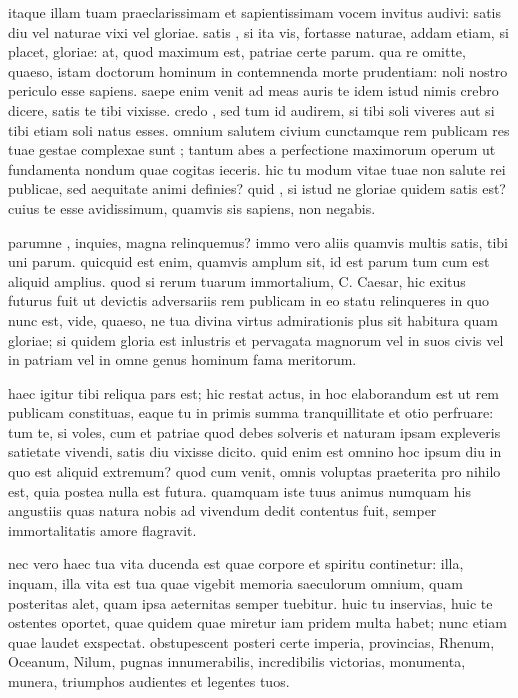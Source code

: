  itaque illam tuam praeclarissimam et sapientissimam vocem invitus audivi: satis diu vel naturae vixi vel gloriae. satis , si ita vis, fortasse naturae, addam etiam, si placet, gloriae: at, quod maximum est, patriae certe parum. qua re omitte, quaeso, istam doctorum hominum in contemnenda morte prudentiam: noli nostro periculo esse sapiens. saepe enim venit ad meas auris te idem istud nimis crebro dicere, satis te tibi vixisse. credo , sed tum id audirem, si tibi soli viveres aut si tibi etiam soli natus esses. omnium salutem civium cunctamque rem publicam res tuae gestae complexae sunt ; tantum abes a perfectione maximorum operum ut fundamenta nondum quae cogitas ieceris. hic tu modum vitae tuae non salute rei publicae, sed aequitate animi definies? quid , si istud ne gloriae quidem satis est? cuius te esse avidissimum, quamvis sis sapiens, non negabis.

 parumne , inquies, magna relinquemus? immo vero aliis quamvis multis satis, tibi uni parum. quicquid est enim, quamvis amplum sit, id est parum tum cum est aliquid amplius. quod si rerum tuarum immortalium, C. Caesar, hic exitus futurus fuit ut devictis adversariis rem publicam in eo statu relinqueres in quo nunc est, vide, quaeso, ne tua divina virtus admirationis plus sit habitura quam gloriae; si quidem gloria est inlustris et pervagata magnorum vel in suos civis vel in patriam vel in omne genus hominum fama meritorum.

 haec igitur tibi reliqua pars est; hic restat actus, in hoc elaborandum est ut rem publicam constituas, eaque tu in primis summa tranquillitate et otio perfruare: tum te, si voles, cum et patriae quod debes solveris et naturam ipsam expleveris satietate vivendi, satis diu vixisse dicito. quid enim est omnino hoc ipsum diu in quo est aliquid extremum? quod cum venit, omnis voluptas praeterita pro nihilo est, quia postea nulla est futura. quamquam iste tuus animus numquam his angustiis quas natura nobis ad vivendum dedit contentus fuit, semper immortalitatis amore flagravit.

 nec vero haec tua vita ducenda est quae corpore et spiritu continetur: illa, inquam, illa vita est tua quae vigebit memoria saeculorum omnium, quam posteritas alet, quam ipsa aeternitas semper tuebitur. huic tu inservias, huic te ostentes oportet, quae quidem quae miretur iam pridem multa habet; nunc etiam quae laudet exspectat. obstupescent posteri certe imperia, provincias, Rhenum, Oceanum, Nilum, pugnas innumerabilis, incredibilis victorias, monumenta, munera, triumphos audientes et legentes tuos.

